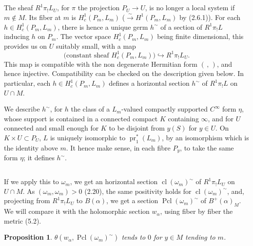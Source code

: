 \documentclass[12pt,a4paper]{article}
\theoremstyle{plain}
\newtheorem{proposition}[theorem]{Proposition}
\theoremstyle{definition}
\theoremstyle{remark}
\numberwithin{equation}{section}
\providecommand{\pr}{\operatorname{pr}}
\providecommand{\cl}{\operatorname{cl}}
\providecommand{\Pcl}{\operatorname{Pcl}}
\begin{document}
\subsection{}
The sheaf $R^1\pi_! L_U$, for $\pi$ the projection $P_U \to U$, is no longer a local system if $m \notin M$. Its fiber at $m$ is $H^1_c(P_m, L_m)$ ($\xrightarrow{\sim} H^1(P_m, L_m)$ by (2.6.1)). For each $h \in H^1_c(P_m, L_m)$, there is hence a unique germ $h^\sim$ of a section of $R^1\pi_! L$ inducing $h$ on $P_m$. The vector space $H^1_c(P_m, L_m)$ being finite dimensional, this provides us on $U$ suitably small, with a map
\begin{equation}\label{eq:6.2.1}
\text{(constant sheaf $H^1_c(P_m, L_m)$)} \hookrightarrow R^1\pi_! L_U.
\end{equation}
This map is compatible with the non degenerate Hermitian form $(\,,\,)$, and hence injective. Compatibility can be checked on the description given below. In particular, each $h \in H^1_c(P_m, L_m)$ defines a horizontal section $h^\sim$ of $R^1\pi_! L$ on $U \cap M$.

We describe $h^\sim$, for $h$ the class of a $L_m$-valued compactly supported $C^\infty$ form $\eta$, whose support is contained in a connected compact $K$ containing $\infty$, and for $U$ connected and small enough for $K$ to be disjoint from $y(S)$ for $y \in U$. On $K \times U \subset P_U$, $L$ is uniquely isomorphic to $\pr_1^*(L_m)$, by an isomorphism which is the identity above $m$. It hence make sense, in each fibre $P_y$, to take the same form $\eta$; it defines $h^\sim$.

\subsection{}
If we apply this to $\omega_m$, we get an horizontal section $\cl(\omega_m)^\sim$ of $R^1\pi_! L_U$ on $U \cap M$. As $(\omega_m, \omega_m) > 0$ (2.20), the same positivity holds for $\cl(\omega_m)^\sim$, and, projecting from $R^1\pi_! L_U$ to $B(\alpha)$, we get a section $\Pcl(\omega_m)^\sim$ of $B^+(\alpha)_M$. We will compare it with the holomorphic section $w_\alpha$, using fiber by fiber the metric (5.2).

\begin{proposition}\label{prop:6.4}
$\theta(w_\alpha, \Pcl(\omega_m)^\sim)$ tends to $0$ for $y \in M$ tending to $m$.
\end{proposition}
\end{document}
